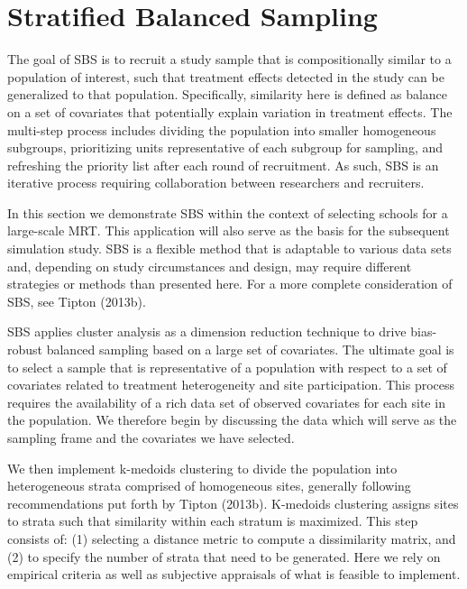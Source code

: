 \documentclass[english,man,floatsintext]{apa6}
\begin{document}
\hypertarget{stratified-balanced-sampling}{%
\section{Stratified Balanced Sampling}\label{stratified-balanced-sampling}}

The goal of SBS is to recruit a study sample that is compositionally similar to a population of interest, such that treatment effects detected in the study can be generalized to that population. Specifically, similarity here is defined as balance on a set of covariates that potentially explain variation in treatment effects. The multi-step process includes dividing the population into smaller homogeneous subgroups, prioritizing units representative of each subgroup for sampling, and refreshing the priority list after each round of recruitment. As such, SBS is an iterative process requiring collaboration between researchers and recruiters.

In this section we demonstrate SBS within the context of selecting schools for a large-scale MRT. This application will also serve as the basis for the subsequent simulation study. SBS is a flexible method that is adaptable to various data sets and, depending on study circumstances and design, may require different strategies or methods than presented here. For a more complete consideration of SBS, see Tipton (2013b).

SBS applies cluster analysis as a dimension reduction technique to drive bias-robust balanced sampling based on a large set of covariates. The ultimate goal is to select a sample that is representative of a population with respect to a set of covariates related to treatment heterogeneity and site participation. This process requires the availability of a rich data set of observed covariates for each site in the population. We therefore begin by discussing the data which will serve as the sampling frame and the covariates we have selected.

We then implement k-medoids clustering to divide the population into heterogeneous strata comprised of homogeneous sites, generally following recommendations put forth by Tipton (2013b). K-medoids clustering assigns sites to strata such that similarity within each stratum is maximized. This step consists of: (1) selecting a distance metric to compute a dissimilarity matrix, and (2) to specify the number of strata that need to be generated. Here we rely on empirical criteria as well as subjective appraisals of what is feasible to implement.
\end{document}
